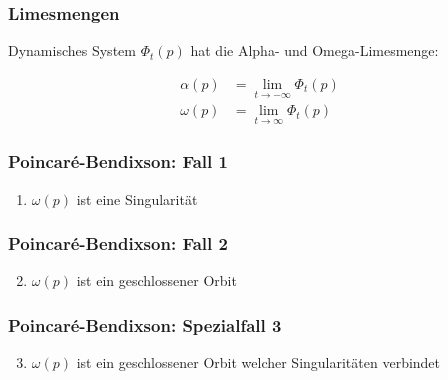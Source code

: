\documentclass[ngerman, aspectratio=169]{beamer}
\begin{document}
    \begin{frame}
    \frametitle{Limesmengen}
        Dynamisches System $\Phi_t(p)$ hat die Alpha- und Omega-Limesmenge:

        \begin{align*}
            \alpha(p) &= \lim_{t\to-\infty} \Phi_t(p) \\
            \omega(p) &= \lim_{t\to\infty} \Phi_t(p)
        \end{align*}
    \end{frame}
    \begin{frame}
    \frametitle{Poincaré-Bendixson: Fall 1}
        \begin{enumerate}
            \item $\omega(p)$ ist eine Singularität
        \end{enumerate}
        \begin{center}
            
        \end{center}
    \end{frame}
    \begin{frame}
    \frametitle{Poincaré-Bendixson: Fall 2}
        \begin{enumerate}
            \setcounter{enumi}{1}
            \item $\omega(p)$ ist ein geschlossener Orbit
        \end{enumerate}
        \begin{center}
            
        \end{center}
    \end{frame}
    \begin{frame}
    \frametitle{Poincaré-Bendixson: Spezialfall 3}
        \begin{enumerate}
            \setcounter{enumi}{2}
            \item $\omega(p)$ ist ein geschlossener Orbit welcher Singularitäten verbindet
        \end{enumerate}
    \end{frame}
\end{document}
